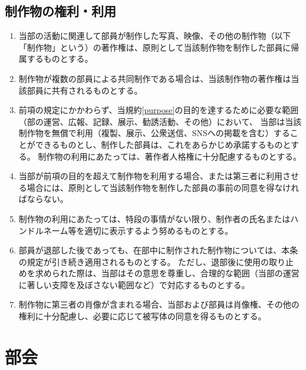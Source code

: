 \documentclass[12pt, unicode, a4paper]{ltjsreport}
\begin{document}
    \section{制作物の権利・利用}\label{production}
        \begin{enumerate}
            \item 当部の活動に関連して部員が制作した写真、映像、その他の制作物（以下「制作物」という）の著作権は、原則として当該制作物を制作した部員に帰属するものとする。
            \item 制作物が複数の部員による共同制作である場合は、当該制作物の著作権は当該部員に共有されるものとする。
            \item 前項の規定にかかわらず、当規約\ref{purpose}の目的を達するために必要な範囲（部の運営、広報、記録、展示、勧誘活動、その他）において、
            当部は当該制作物を無償で利用（複製、展示、公衆送信、SNSへの掲載を含む）することができるものとし、制作した部員は、これをあらかじめ承諾するものとする。
            制作物の利用にあたっては、著作者人格権に十分配慮するものとする。
            \item 当部が前項の目的を超えて制作物を利用する場合、または第三者に利用させる場合には、原則として当該制作物を制作した部員の事前の同意を得なければならない。
            \item 制作物の利用にあたっては、特段の事情がない限り、制作者の氏名またはハンドルネーム等を適切に表示するよう努めるものとする。
            \item 部員が退部した後であっても、在部中に制作された制作物については、本条の規定が引き続き適用されるものとする。
            ただし、退部後に使用の取り止めを求められた際は、当部はその意思を尊重し、合理的な範囲（当部の運営に著しい支障を及ぼさない範囲など）で対応するものとする。
            \item 制作物に第三者の肖像が含まれる場合、当部および部員は肖像権、その他の権利に十分配慮し、必要に応じて被写体の同意を得るものとする。
        \end{enumerate}


\chapter{部会}
\end{document}
